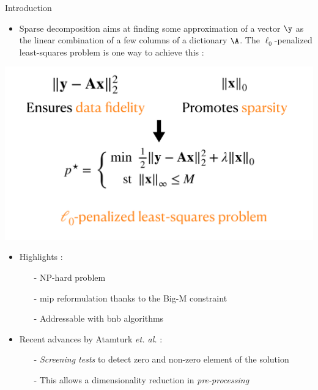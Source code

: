 \documentclass[final]{beamer}
\newlength{\onecolwid}
\newcommand{\emphone}[1]{\textit{\color{norange}#1}}
\begin{document}
\begin{frame}[t]
\begin{columns}[t]
\begin{column}{\onecolwid}
    \begin{block}{Introduction}
        \begin{itemize}
            \item \hspace*{0.1em} Sparse decomposition aims at finding some approximation of a vector $\obs$ as the linear combination of a few columns of a dictionary $\dic$. The $\ell_0$-penalized least-squares problem is one way to achieve this :
        \end{itemize}
        \includegraphics[width=\linewidth]{imgs/problem.pdf}
        \vspace*{-2em}
        \begin{itemize}
            \item \hspace*{0.1em} Highlights :
            \begin{itemize}
                \normalsize \item[-] \hspace*{0.1em} NP-hard problem
                \item[-] \hspace*{0.1em} \gls{mip} reformulation thanks to the Big-M constraint
                \item[-] \hspace*{0.1em} Addressable with \gls{bnb} algorithms  
            \end{itemize}
        \end{itemize}

        \begin{itemize}
            \item \hspace*{0.1em} Recent advances by Atamturk \textit{et. al.} :
            \begin{itemize}
                \normalsize \item[-] \hspace*{0.1em} \emphone{Screening tests} to detect zero and non-zero element of the solution
                \item[-] \hspace*{0.1em} This allows a dimensionality reduction in \emphone{pre-processing}
            \end{itemize}
        \end{itemize}


\end{block}
\end{column}
\end{columns}
\end{frame}
\end{document}
